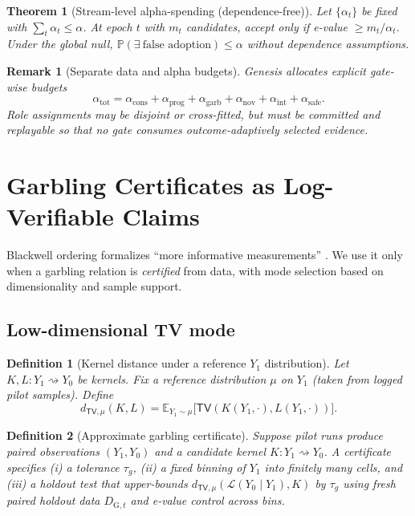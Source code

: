 \documentclass[11pt,a4paper]{article}
\newtheorem{theorem}{Theorem}[section]
\newtheorem{definition}{Definition}[section]
\newtheorem{remark}{Remark}[section]
\newcommand{\TV}{\mathsf{TV}}
\begin{document}
\begin{theorem}[Stream-level alpha-spending (dependence-free)]
Let $\{\alpha_t\}$ be fixed with $\sum_t \alpha_t\le \alpha$.
At epoch $t$ with $m_t$ candidates, accept only if e-value $\ge m_t/\alpha_t$.
Under the global null, $\mathbb{P}(\exists\ \text{false adoption})\le \alpha$ without dependence assumptions.
\end{theorem}

\begin{remark}[Separate data and alpha budgets]
Genesis allocates explicit gate-wise budgets
\[
\alpha_{\mathrm{tot}}=
\alpha_{\mathrm{cons}}+\alpha_{\mathrm{prog}}+\alpha_{\mathrm{garb}}+\alpha_{\mathrm{nov}}+\alpha_{\mathrm{int}}+\alpha_{\mathrm{safe}}.
\]
Role assignments may be disjoint or cross-fitted, but must be committed and replayable so that no gate consumes outcome-adaptively selected evidence.
\end{remark}

\section{Garbling Certificates as Log-Verifiable Claims}

Blackwell ordering formalizes ``more informative measurements'' \citep{Blackwell1953}.
We use it only when a garbling relation is \emph{certified} from data, with mode selection based on dimensionality and sample support.

\subsection{Low-dimensional TV mode}
\begin{definition}[Kernel distance under a reference $Y_1$ distribution]
Let $K,L:Y_1\rightsquigarrow Y_0$ be kernels.
Fix a reference distribution $\mu$ on $Y_1$ (taken from logged pilot samples).
Define
\[
d_{\TV,\mu}(K,L)=\mathbb{E}_{Y_1\sim \mu}\big[\TV(K(Y_1,\cdot),L(Y_1,\cdot))\big].
\]
\end{definition}

\begin{definition}[Approximate garbling certificate]
Suppose pilot runs produce paired observations $(Y_1,Y_0)$ and a candidate kernel $K:Y_1\rightsquigarrow Y_0$.
A certificate specifies (i) a tolerance $\tau_g$, (ii) a fixed binning of $Y_1$ into finitely many cells, and (iii) a holdout test that upper-bounds
$d_{\TV,\mu}(\mathcal{L}(Y_0\mid Y_1),K)$ by $\tau_g$ using fresh paired holdout data $D_{\mathrm{G},t}$ and e-value control across bins.
\end{definition}
\end{document}
